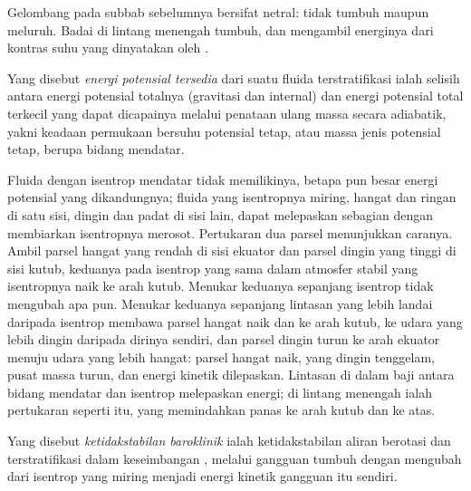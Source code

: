 Gelombang pada subbab sebelumnya bersifat netral: tidak tumbuh maupun meluruh.
Badai di lintang menengah tumbuh, dan mengambil energinya dari
kontras suhu yang dinyatakan oleh .

\begin{definition}\label{def:b3:atmospheric-dynamics:ape}
Yang disebut \emph{energi potensial tersedia} dari
suatu fluida terstratifikasi ialah selisih antara energi potensial totalnya
(gravitasi dan internal) dan energi potensial total terkecil yang
dapat dicapainya melalui penataan ulang massa secara adiabatik, yakni keadaan
permukaan bersuhu potensial tetap, atau massa jenis potensial tetap, berupa
bidang mendatar.
\end{definition}

Fluida dengan isentrop mendatar tidak memilikinya, betapa pun besar energi potensial
yang dikandungnya; fluida yang isentropnya miring, hangat dan ringan di satu sisi, dingin
dan padat di sisi lain, dapat melepaskan sebagian dengan membiarkan isentropnya merosot. Pertukaran
dua parsel menunjukkan caranya. Ambil parsel hangat yang rendah di sisi ekuator dan
parsel dingin yang tinggi di sisi kutub, keduanya pada isentrop yang sama dalam
atmosfer stabil yang isentropnya naik ke arah kutub. Menukar keduanya sepanjang
isentrop tidak mengubah apa pun. Menukar keduanya sepanjang lintasan yang lebih landai daripada
isentrop membawa parsel hangat naik dan ke arah kutub, ke udara yang lebih dingin daripada
dirinya sendiri, dan parsel dingin turun ke arah ekuator menuju udara yang lebih hangat:
parsel hangat naik, yang dingin tenggelam, pusat massa turun, dan energi kinetik
dilepaskan. Lintasan di dalam baji antara bidang mendatar dan
isentrop melepaskan energi;  di lintang menengah ialah pertukaran
seperti itu, yang memindahkan panas ke arah kutub dan ke atas.

\begin{definition}\label{def:b3:atmospheric-dynamics:baroclinic-instability}
Yang disebut \emph{ketidakstabilan baroklinik} ialah
ketidakstabilan aliran berotasi dan terstratifikasi dalam keseimbangan , melalui
gangguan tumbuh dengan mengubah  dari
isentrop yang miring menjadi energi kinetik gangguan itu sendiri.
\end{definition}

